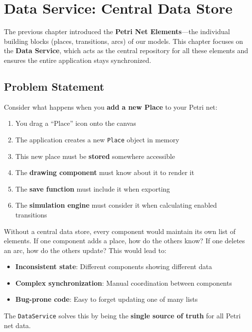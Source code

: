 \chapter{Data Service: Central Data Store}
\label{chap:data-service}

The previous chapter introduced the \textbf{Petri Net Elements}---the individual building blocks (places, transitions, arcs) of our models. This chapter focuses on the \textbf{Data Service}, which acts as the central repository for all these elements and ensures the entire application stays synchronized.

\section{Problem Statement}
\label{sec:data-problem}

Consider what happens when you \textbf{add a new Place} to your Petri net:

\begin{enumerate}
    \item You drag a ``Place'' icon onto the canvas
    \item The application creates a new \texttt{Place} object in memory
    \item This new place must be \textbf{stored} somewhere accessible
    \item The \textbf{drawing component} must know about it to render it
    \item The \textbf{save function} must include it when exporting
    \item The \textbf{simulation engine} must consider it when calculating enabled transitions
\end{enumerate}

Without a central data store, every component would maintain its own list of elements. If one component adds a place, how do the others know? If one deletes an arc, how do the others update? This would lead to:

\begin{itemize}
    \item \textbf{Inconsistent state}: Different components showing different data
    \item \textbf{Complex synchronization}: Manual coordination between components
    \item \textbf{Bug-prone code}: Easy to forget updating one of many lists
\end{itemize}

The \texttt{DataService} solves this by being the \textbf{single source of truth} for all Petri net data.

